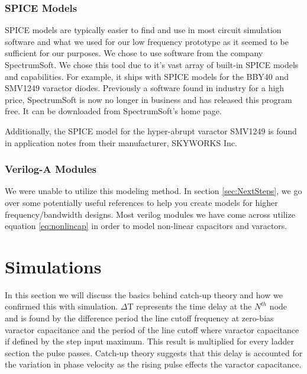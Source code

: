 \documentclass[journal]{IEEEtran} \usepackage[english]{babel}
\begin{document}
    
\subsubsection{SPICE Models}

SPICE models are typically easier to find and use in most circuit simulation
software and what we used for our low frequency prototype as it seemed to be
sufficient for our purposes. We chose to use software from the company
SpectrumSoft. We chose this tool due to it's vast array of built-in SPICE models
and capabilities. For example, it ships with SPICE models for the BBY40 and
SMV1249 varactor diodes. Previously a software found in industry for a high
price, SpectrumSoft is now no longer in business and has released this program
free. It can be downloaded from SpectrumSoft's home page.


Additionally, the SPICE model for the hyper-abrupt varactor SMV1249 is found in
application notes from their manufacturer, SKYWORKS Inc.




\subsubsection{Verilog-A Modules}

We were unable to utilize this modeling method. In section \ref{sec:NextSteps}, 
we go over some potentially useful references to help you create models for
higher frequency/bandwidth designs. Most verilog modules we have come across
utilize equation \ref{eq:nonlincap} in order to model non-linear capacitors and
varactors.







\section{ Simulations }

In this section we will discuss the basics behind catch-up
theory\cite{wilson1991pulse} and how we confirmed this with simulation.
$\Delta$T represents the time delay at the $N^{th}$ node and is found by the
difference period the line cutoff frequency at zero-bias varactor capacitance
and the period of the line cutoff where varactor capacitance if defined by the
step input maximum. This result is multiplied for every ladder section the pulse
passes. Catch-up theory suggests that this delay is accounted for the variation
in phase velocity as the rising pulse effects the varactor capacitance.
\end{document}
